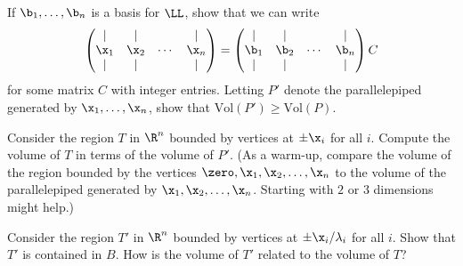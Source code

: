 \begin{explor}
	If $\b_1,\ldots,\b_n$ is a basis for $\LL$, show that we can write 
	\[\begin{pmatrix}
	\mid & \mid & & \mid\\
	\x_1 & \x_2 & \cdots & \x_n\\
	\mid & \mid & & \mid	
	\end{pmatrix}=\begin{pmatrix}
	\mid & \mid & & \mid\\
	\b_1 & \b_2 & \cdots & \b_n\\
	\mid & \mid & & \mid	
	\end{pmatrix}C\]
	for some matrix $C$ with integer entries. Letting $P'$ denote the parallelepiped generated by $\x_1,\ldots,\x_n$, show that $\text{Vol}(P')\geq \text{Vol}(P)$.
\end{explor}

\begin{explor}
	Consider the region $T$ in $\R^n$ bounded by vertices at $\pm \x_i$ for all $i$. Compute the volume of $T$ in terms of the volume of $P'$. \color{DarkGreen}(As a warm-up, compare the volume of the region bounded by the vertices $\zero,\x_1,\x_2,\ldots,\x_n$ to the volume of the parallelepiped generated by $\x_1,\x_2,\ldots,\x_n$. Starting with $2$ or $3$ dimensions might help.)
\end{explor}

\begin{explor}
	Consider the region $T'$ in $\R^n$ bounded by vertices at $\pm \x_i/\lambda_i$ for all $i$. Show that $T'$ is contained in $B$. How is the volume of $T'$ related to the volume of $T$?
\end{explor}

\setlength{\boxsep}{\tempboxsep}